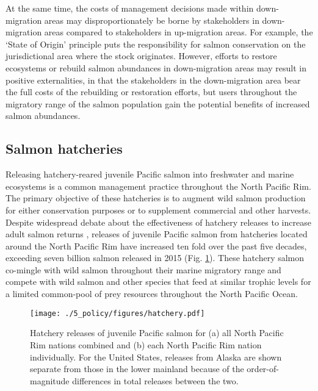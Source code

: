 At the same time, the costs of management decisions made within down-migration
areas may disproportionately be borne by stakeholders in down-migration areas
compared to stakeholders in up-migration areas. For example, the `State of
Origin' principle puts the responsibility for salmon conservation on the
jurisdictional area where the stock originates. However, efforts to restore
ecosystems or rebuild salmon abundances in down-migration areas may result in
positive externalities, in that the stakeholders in the down-migration area bear
the full costs of the rebuilding or restoration efforts, but users throughout
the migratory range of the salmon population gain the potential benefits of
increased salmon abundances.


\subsection{Salmon hatcheries}

Releasing hatchery-reared juvenile Pacific salmon into freshwater and marine
ecosystems is a common management practice throughout the North Pacific Rim. The
primary objective of these hatcheries is to augment wild salmon production for
either conservation purposes or to supplement commercial and other harvests.
Despite widespread debate about the effectiveness of hatchery releases to
increase adult salmon returns \citep{Hilborn2000a, Wertheimer2001a,
Hilborn2001a}, releases of juvenile Pacific salmon from hatcheries located
around the North Pacific Rim have increased ten fold over the past five decades,
exceeding seven billion salmon released in 2015 (Fig. \ref{fig:ebm:3}). These
hatchery salmon co-mingle with wild salmon throughout their marine migratory
range and compete with wild salmon and other species that feed at similar
trophic levels for a limited common-pool of prey resources throughout the North
Pacific Ocean.

\begin{figure}[htbp]
  \centering \texttt{[image: ./5\_policy/figures/hatchery.pdf]}
  \caption[Hatchery releases of juvenile Pacific salmon from North Pacific Rim
           nations]{Hatchery releases of juvenile Pacific salmon for (a) all
           North Pacific Rim nations combined and (b) each North Pacific Rim
           nation individually. For the United States, releases from Alaska are
           shown separate from those in the lower mainland because of the
           order-of-magnitude differences in total releases between the two.}
  \label{fig:ebm:3}
\end{figure}

